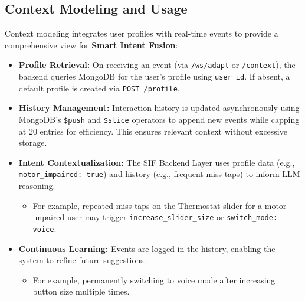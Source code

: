 \documentclass[openany]{book}
\begin{document}
\subsection{Context Modeling and Usage}
Context modeling integrates user profiles with real-time events to provide a comprehensive view for \textbf{Smart Intent Fusion}:
\begin{itemize}
    \item \textbf{Profile Retrieval:} On receiving an event (via \texttt{/ws/adapt} or \texttt{/context}), the backend queries MongoDB for the user’s profile using \texttt{user\_id}. If absent, a default profile is created via \texttt{POST /profile}.
    
    \item \textbf{History Management:} Interaction history is updated asynchronously using MongoDB’s \texttt{\$push} and \texttt{\$slice} operators to append new events while capping at 20 entries for efficiency. This ensures relevant context without excessive storage.

    \item \textbf{Intent Contextualization:} The SIF Backend Layer uses profile data (e.g., \texttt{motor\_impaired: true}) and history (e.g., frequent miss-taps) to inform LLM reasoning.
    \begin{itemize}
        \item For example, repeated miss-taps on the Thermostat slider for a motor-impaired user may trigger \texttt{increase\_slider\_size} or \texttt{switch\_mode: voice}.
    \end{itemize}

    \item \textbf{Continuous Learning:} Events are logged in the history, enabling the system to refine future suggestions.
    \begin{itemize}
        \item For example, permanently switching to voice mode after increasing button size multiple times.
    \end{itemize}
\end{itemize}
\end{document}
